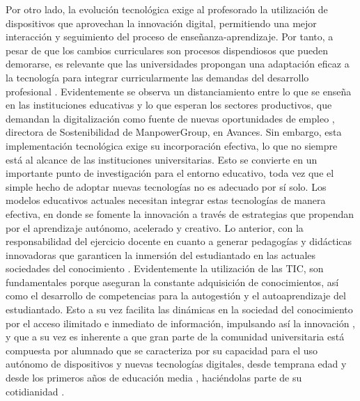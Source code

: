 \documentclass[spanish]{textolivre}
\begin{document}
Por otro lado, la evolución tecnológica exige al profesorado la utilización de dispositivos que aprovechan la innovación digital, permitiendo una mejor interacción y   seguimiento del proceso de enseñanza-aprendizaje. Por tanto, a pesar de que los cambios curriculares son procesos dispendiosos que pueden demorarse, es relevante que las universidades propongan una adaptación eficaz a la tecnología para integrar curricularmente las demandas del desarrollo profesional \cite{manfredi_sanchez_innovacion_2019}. Evidentemente se observa un distanciamiento entre lo que se enseña en las instituciones educativas y lo que esperan los sectores productivos, que demandan la digitalización como fuente de nuevas oportunidades de empleo \cite{moliner_tecnologiy_2021}, directora de Sostenibilidad de ManpowerGroup, en Avances. Sin embargo, esta implementación tecnológica exige su incorporación efectiva, lo que no siempre está al alcance de las instituciones universitarias. Esto se convierte en un importante punto de investigación para el entorno educativo, toda vez que el simple hecho de adoptar nuevas tecnologías no es adecuado por sí solo. Los modelos educativos actuales necesitan integrar estas tecnologías de manera efectiva, en donde se fomente la innovación a través de estrategias que propendan por el aprendizaje autónomo, acelerado y creativo. Lo anterior, con la responsabilidad del ejercicio docente en cuanto a generar pedagogías y didácticas innovadoras que garanticen la inmersión del estudiantado en las actuales sociedades del conocimiento \cite{falco_reconsiderando_2017}. Evidentemente la utilización de las TIC, son fundamentales porque aseguran la constante adquisición de conocimientos, así como el desarrollo de competencias para la autogestión y el autoaprendizaje del estudiantado. Esto a su vez facilita las dinámicas en la sociedad del conocimiento por el acceso ilimitado e inmediato de información, impulsando así la innovación \cite{urcid_puga_autoaprendizaje_2022}, y que a su vez es inherente a que gran parte de la comunidad universitaria está compuesta por alumnado que se caracteriza por su capacidad para el uso autónomo de dispositivos y nuevas tecnologías digitales, desde temprana edad y desde los primeros años de educación media \cite{mesa_rave_escenarios_2023}, haciéndolas parte de su cotidianidad \cite{granados_maguino_tecnologien_2020}.
\end{document}

